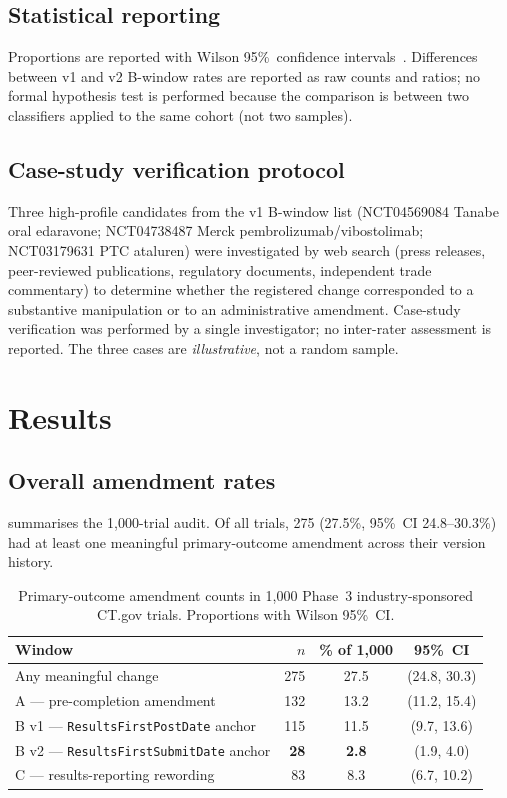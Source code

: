 \documentclass[11pt,a4paper]{article}
\begin{document}
\subsection{Statistical reporting}
Proportions are reported with Wilson 95\%~confidence
intervals~\cite{agresti2002categorical}. Differences between v1 and
v2 B-window rates are reported as raw counts and ratios; no formal
hypothesis test is performed because the comparison is between two
classifiers applied to the same cohort (not two samples).

\subsection{Case-study verification protocol}
Three high-profile candidates from the v1 B-window list
(NCT04569084 Tanabe oral edaravone;
NCT04738487 Merck pembrolizumab/vibostolimab;
NCT03179631 PTC ataluren) were investigated by web search
(press releases, peer-reviewed publications, regulatory documents,
independent trade commentary) to determine whether the registered
change corresponded to a substantive manipulation or to an
administrative amendment. Case-study verification was performed by
a single investigator; no inter-rater assessment is reported. The
three cases are \emph{illustrative}, not a random sample.

\section{Results}
\label{sec:results}

\subsection{Overall amendment rates}
 summarises the 1{,}000-trial audit. Of all trials,
275 (27.5\%, 95\%~CI 24.8--30.3\%) had at least one meaningful
primary-outcome amendment across their version history.

\begin{table}[htbp]
\centering
\caption{Primary-outcome amendment counts in 1{,}000 Phase~3
industry-sponsored CT.gov trials. Proportions with Wilson
95\%~CI.}\label{tab:main}
\begin{tabular}{lrcc}
\toprule
Window & $n$ & \% of 1{,}000 & 95\%~CI \\
\midrule
Any meaningful change                                & 275 & 27.5 & (24.8, 30.3) \\
A --- pre-completion amendment                       & 132 & 13.2 & (11.2, 15.4) \\
B v1 --- \texttt{ResultsFirstPostDate} anchor        & 115 & 11.5 & (9.7, 13.6)  \\
B v2 --- \texttt{ResultsFirstSubmitDate} anchor      & \textbf{28}  & \textbf{2.8}  & (1.9, 4.0)   \\
C --- results-reporting rewording                    &  83 & \phantom{0}8.3 & (6.7, 10.2)  \\
\bottomrule
\end{tabular}
\end{table}
\end{document}
